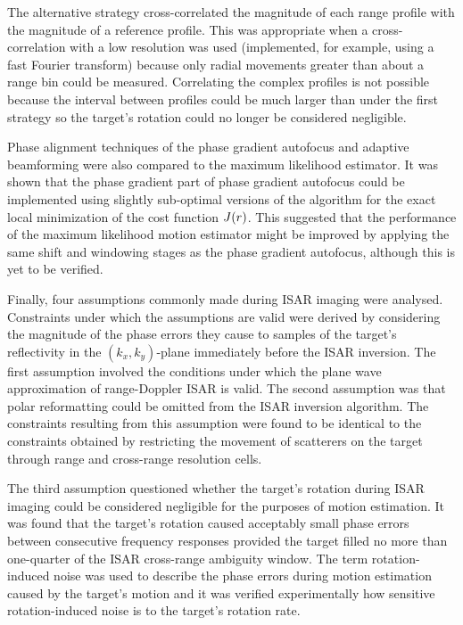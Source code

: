 The alternative strategy cross-correlated the magnitude of each range
profile with the magnitude of a reference profile.  This was appropriate 
when a cross-correlation with a low resolution was used 
(implemented, for example, using a fast Fourier transform) because
only radial movements greater than about a range bin
could be measured.  Correlating the complex profiles is not possible because
the interval between profiles could be much larger than under the
first strategy so the target's rotation could no longer be considered
negligible.

Phase alignment techniques of the phase gradient autofocus and adaptive
beamforming were also compared to the maximum likelihood estimator.  It was
shown that the phase gradient part of phase gradient autofocus could be
implemented using slightly sub-optimal versions of the algorithm for the 
exact local minimization of the cost function $J({r})$.  This suggested that
the performance of the maximum likelihood motion estimator might be
improved by applying the same shift and windowing stages as the phase
gradient autofocus, although this is yet to be verified.

Finally, four assumptions commonly made during ISAR imaging were analysed. 
Constraints under which the assumptions are valid were derived by
considering the magnitude of the phase errors they cause to samples of the
target's reflectivity in the $(k_x,k_y)$-plane immediately before the ISAR
inversion.  The first assumption involved the conditions under which the
plane wave approximation of range-Doppler ISAR is valid.  The second
assumption was that polar reformatting could be omitted from the ISAR
inversion algorithm.  The constraints resulting from this assumption were
found to be identical to the constraints obtained by restricting the movement
of scatterers on the target through range and cross-range resolution cells.

The third assumption questioned whether the target's rotation during ISAR
imaging could be considered negligible for the purposes of motion
estimation.  It was found that the target's rotation caused acceptably small
phase errors between consecutive frequency responses provided the target
filled no more than one-quarter of the ISAR cross-range ambiguity window.
The term rotation-induced noise was used to describe the phase errors during
motion estimation caused by the target's motion and it was verified
experimentally how sensitive rotation-induced noise is to the target's
rotation rate.


